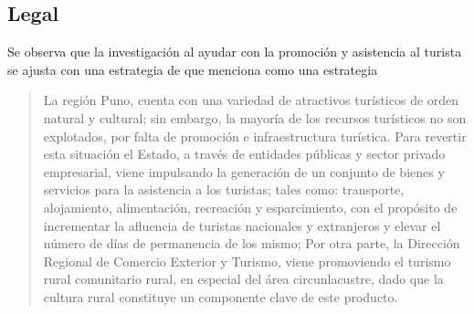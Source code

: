 \subsection{Legal}
Se observa que la investigación al ayudar con la promoción y asistencia al turista se ajusta con una estrategia de  que menciona como una estrategia 
\begin{quote}La región Puno, cuenta con una variedad de atractivos turísticos de orden natural y cultural; sin embargo, la mayoría de los recursos turísticos no son explotados, por falta de promoción e infraestructura turística. Para revertir esta situación el Estado, a través de entidades públicas y sector privado empresarial, viene impulsando la generación de un conjunto de bienes y servicios para la asistencia a los turistas; tales como: transporte, alojamiento, alimentación, recreación y esparcimiento, con el propósito de incrementar la afluencia de turistas nacionales y extranjeros y elevar el número de días de permanencia de los mismo; Por otra parte, la Dirección Regional de Comercio Exterior y Turismo, viene promoviendo el turismo rural comunitario rural, en especial del área circunlacustre, dado que la cultura rural constituye un componente clave de este producto.\end{quote} 



